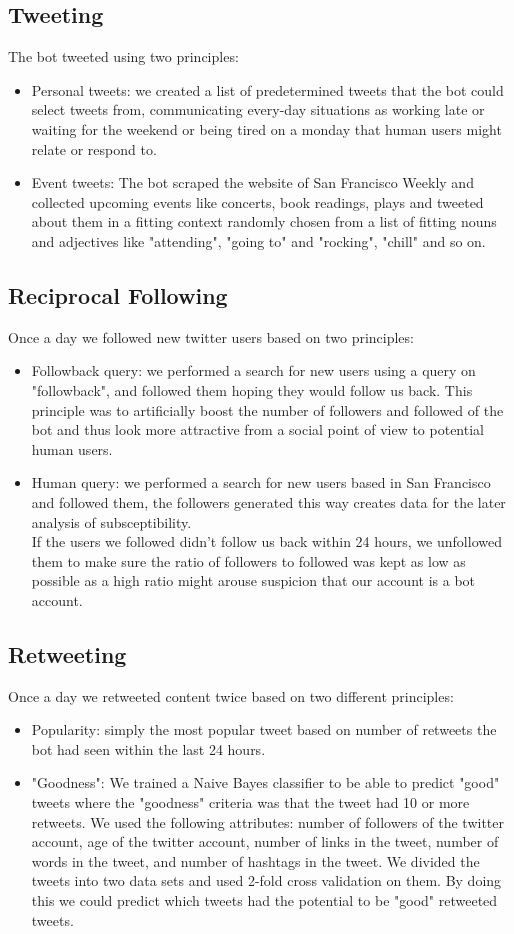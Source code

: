 \documentclass[10pt]{IEEEtran}
\begin{document}
\subsection{Tweeting}
The bot tweeted using two principles:
\begin{itemize}
\item Personal tweets: we created a list of predetermined tweets that the bot could select tweets from, communicating every-day situations as working late or waiting for the weekend or being tired on a monday that human users might relate or respond to.
\item Event tweets: The bot scraped the website of San Francisco Weekly and collected upcoming events like concerts, book readings, plays and tweeted about them in a fitting context randomly chosen from a list of fitting nouns and adjectives like "attending", "going to" and "rocking", "chill" and so on.
\end{itemize}
\subsection{Reciprocal Following}
Once a day we followed new twitter users based on two principles:
\begin{itemize}
\item Followback query: we performed a search for new users using a query on "followback", and followed them hoping they would follow us back. This principle was to artificially boost the number of followers and followed of the bot and thus look more attractive from a social point of view to potential human users.
\item Human query: we performed a search for new users based in San Francisco and followed them, the followers generated this way creates data for the later analysis of subsceptibility.\\
 If the users we followed didn't follow us back within 24 hours, we unfollowed them to make sure the ratio of followers to followed was kept as low as possible as a high ratio might arouse suspicion that our account is a bot account.
\end{itemize}
\subsection{Retweeting}
Once a day we retweeted content twice based on two different principles:
\begin{itemize}
\item Popularity: simply the most popular tweet based on number of retweets the bot had seen within the last 24 hours.
\item "Goodness": We trained a Naive Bayes classifier to be able to predict "good" tweets where the "goodness" criteria was that the tweet had 10 or more retweets. We used the following attributes: number of followers of the twitter account, age of the twitter account, number of links in the tweet, number of words in the tweet, and number of hashtags in the tweet. We divided the tweets into two data sets and used 2-fold cross validation on them. By doing this we could predict which tweets had the potential to be "good" retweeted tweets.
\end{itemize}
\end{document}
